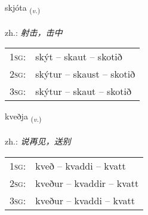 \documentclass[frontgrid, backgrid]{flacards}\usepackage[]{graphicx}\usepackage[]{xcolor}
\begin{document}
\renewcommand{\blhead}{\vskip5pt {\small\bfseries\footnotesize Sagnorð | 动词 }}
\renewcommand{\bcfoot}{\vskip5pt \hspace{2pt}{\small\bfseries\footnotesize 1K}}


{skjóta \small{\textsubscript{(\textit{v.})}} \\[1ex] %
\textphonetic{[scouːta]} \\
zh.: \emph{射击，击中} \\  [2ex]
\renewcommand*{\arraystretch}{0.8}
\begin{tabular}{p{1cm}l}
\textsc{1sg}: & skýt -- skaut -- skotið \\ 
\textsc{2sg}: & skýtur -- skaust -- skotið \\ 
\textsc{3sg}: & skýtur -- skaut -- skotið \\ 
\end{tabular}
}

\renewcommand{\flhead}{\vskip5pt \fboxsep=0pt {\small\bfseries\footnotesize Sagnorð | 动词}}
\renewcommand{\fcfoot}{\vskip5pt \fboxsep=0pt \hspace{2pt}{\small\bfseries\footnotesize 1K}}

\renewcommand{\blhead}{\vskip5pt {\small\bfseries\footnotesize Sagnorð | 动词 }}
\renewcommand{\bcfoot}{\vskip5pt \hspace{2pt}{\small\bfseries\footnotesize 1K}}


{kveðja \small{\textsubscript{(\textit{v.})}} \\[1ex] %
\textphonetic{[kʰvɛðja]} \\
zh.: \emph{说再见，送别} \\  [2ex]
\renewcommand*{\arraystretch}{0.8}
\begin{tabular}{p{1cm}l}
\textsc{1sg}: & kveð -- kvaddi -- kvatt \\ 
\textsc{2sg}: & kveður -- kvaddir -- kvatt \\ 
\textsc{3sg}: & kveður -- kvaddi -- kvatt \\ 
\end{tabular}
}
\end{document}
